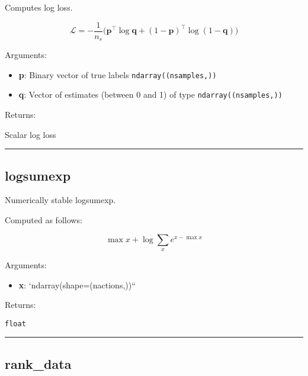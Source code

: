 Computes log loss.

\[
\mathcal L = - \frac{1}{n_s} \big( \mathbf p^\top \log \mathbf q + (1-\mathbf p)^\top \log (1 - \mathbf q) \big)
\]

Arguments:

\begin{itemize}
\tightlist
\item
  \textbf{p}: Binary vector of true labels \texttt{ndarray((nsamples,))}
\item
  \textbf{q}: Vector of estimates (between 0 and 1) of type
  \texttt{ndarray((nsamples,))}
\end{itemize}

Returns:

Scalar log loss

\begin{center}\rule{0.5\linewidth}{\linethickness}\end{center}

\subsection{logsumexp}\label{logsumexp}

\begin{Shaded}
\begin{Highlighting}[]
\end{Highlighting}
\end{Shaded}

Numerically stable logsumexp.

Computed as follows:

\[
\max x + \log \sum_x e^{x - \max x}
\]

Arguments:

\begin{itemize}
\tightlist
\item
  \textbf{x}: `ndarray(shape=(nactions,))``
\end{itemize}

Returns:

\texttt{float}

\begin{center}\rule{0.5\linewidth}{\linethickness}\end{center}

\subsection{rank\_data}\label{rank_data}

\begin{Shaded}
\begin{Highlighting}[]
\end{Highlighting}
\end{Shaded}

